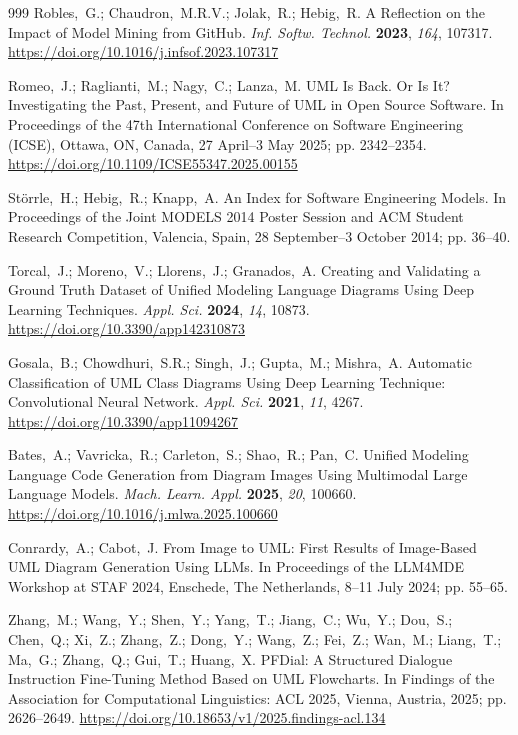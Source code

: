 \documentclass[11pt]{article}
\begin{document}
\begin{thebibliography}{999}
Robles,~G.; Chaudron,~M.R.V.; Jolak,~R.; Hebig,~R. A Reflection on the Impact of Model Mining from GitHub. {\em Inf. Softw. Technol.} {\bf 2023}, {\em 164}, 107317. \url{https://doi.org/10.1016/j.infsof.2023.107317}

Romeo,~J.; Raglianti,~M.; Nagy,~C.; Lanza,~M. UML Is Back. Or Is It? Investigating the Past, Present, and Future of UML in Open Source Software. In Proceedings of the 47th International Conference on Software Engineering (ICSE), Ottawa, ON, Canada, 27 April--3 May 2025; pp. 2342--2354. \url{https://doi.org/10.1109/ICSE55347.2025.00155}

St\"{o}rrle,~H.; Hebig,~R.; Knapp,~A. An Index for Software Engineering Models. In Proceedings of the Joint MODELS 2014 Poster Session and ACM Student Research Competition, Valencia, Spain, 28 September--3 October 2014; pp. 36--40.

Torcal,~J.; Moreno,~V.; Llorens,~J.; Granados,~A. Creating and Validating a Ground Truth Dataset of Unified Modeling Language Diagrams Using Deep Learning Techniques. {\em Appl. Sci.} {\bf 2024}, {\em 14}, 10873. \url{https://doi.org/10.3390/app142310873}

Gosala,~B.; Chowdhuri,~S.R.; Singh,~J.; Gupta,~M.; Mishra,~A. Automatic Classification of UML Class Diagrams Using Deep Learning Technique: Convolutional Neural Network. {\em Appl. Sci.} {\bf 2021}, {\em 11}, 4267. \url{https://doi.org/10.3390/app11094267}

Bates,~A.; Vavricka,~R.; Carleton,~S.; Shao,~R.; Pan,~C. Unified Modeling Language Code Generation from Diagram Images Using Multimodal Large Language Models. {\em Mach. Learn. Appl.} {\bf 2025}, {\em 20}, 100660. \url{https://doi.org/10.1016/j.mlwa.2025.100660}

Conrardy,~A.; Cabot,~J. From Image to UML: First Results of Image-Based UML Diagram Generation Using LLMs. In Proceedings of the LLM4MDE Workshop at STAF 2024, Enschede, The Netherlands, 8--11 July 2024; pp. 55--65.

Zhang,~M.; Wang,~Y.; Shen,~Y.; Yang,~T.; Jiang,~C.; Wu,~Y.; Dou,~S.; Chen,~Q.; Xi,~Z.; Zhang,~Z.; Dong,~Y.; Wang,~Z.; Fei,~Z.; Wan,~M.; Liang,~T.; Ma,~G.; Zhang,~Q.; Gui,~T.; Huang,~X. PFDial: A Structured Dialogue Instruction Fine-Tuning Method Based on UML Flowcharts. In Findings of the Association for Computational Linguistics: ACL 2025, Vienna, Austria, 2025; pp. 2626--2649. \url{https://doi.org/10.18653/v1/2025.findings-acl.134}

\end{thebibliography}
\end{document}
